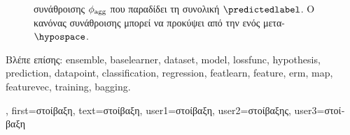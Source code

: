 {{\begin{figure}[H]
\begin{center}
{{{			συνάθροισης $\phi_{\rm agg}$ που παραδίδει τη συνολική}  $\predictedlabel$. 
			\foreignlanguage{greek}{Ο κανόνας συνάθροισης μπορεί να προκύψει από την}  \foreignlanguage{greek}{ενός 
			μετα-} $\hypospace$.} }
			\end{center}
		\end{figure}
	 	\foreignlanguage{greek}{Βλέπε επίσης:} \gls{ensemble}, \gls{baselearner}, \gls{dataset}, \gls{model}, \gls{lossfunc}, \gls{hypothesis}, 
		\gls{prediction}, \gls{datapoint}, \gls{classification}, \gls{regression}, \gls{featlearn}, \gls{feature}, \gls{erm}, \gls{map}, \gls{featurevec}, 
		\gls{training}, \gls{bagging}. },
	first={\foreignlanguage{greek}{στοίβαξη}},
	text={\foreignlanguage{greek}{στοίβαξη}},
	user1={\foreignlanguage{greek}{στοίβαξη}}, %
	user2={\foreignlanguage{greek}{στοίβαξης}}, %
	user3={\foreignlanguage{greek}{στοίβαξη}} %
}

